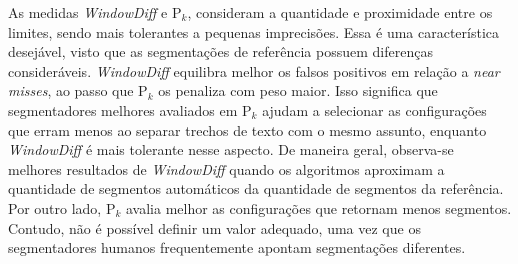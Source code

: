 As medidas \textit{WindowDiff} e P$_k$, consideram a quantidade e proximidade entre os limites, sendo mais tolerantes a pequenas imprecisões. Essa é uma característica desejável, visto que as segmentações de referência possuem diferenças consideráveis. \textit{WindowDiff} equilibra melhor os falsos positivos em relação a \textit{near misses}, ao passo que P$_k$ os penaliza com peso maior. Isso significa que segmentadores melhores avaliados em P$_k$ ajudam a selecionar as configurações que erram menos ao separar trechos de texto com o mesmo assunto, enquanto \textit{WindowDiff} é mais tolerante nesse aspecto.  De maneira geral, observa-se  melhores resultados de \textit{WindowDiff} quando os algoritmos aproximam a quantidade de segmentos automáticos da quantidade de segmentos da referência. Por outro lado, P$_k$ avalia melhor as configurações que retornam menos segmentos. Contudo, não é possível definir um valor adequado, uma vez que os segmentadores humanos frequentemente apontam segmentações diferentes.


